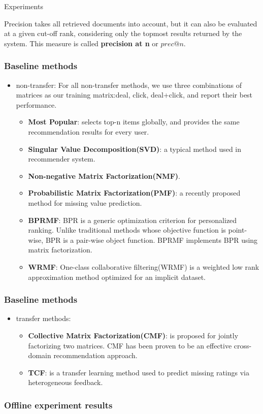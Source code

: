 \documentclass[xetex,mathserif,serif]{beamer}
\begin{document}
\begin{section}{Experiments}
\begin{frame}
    \par{Precision takes all retrieved documents into account, but it can also be evaluated at a given cut-off rank, considering only the topmost results returned by the system. This measure is called \textbf{precision at n} or \textbf{$prec@n$}.}
  \end{frame}
  \begin{frame}
    \frametitle{Baseline methods}
    \begin{itemize}
    \item non-transfer:
      For all non-transfer methods, we use three combinations of matrices as our training matrix:{deal, click, deal+click}, and report their \alert{best} performance.
      \begin{itemize}
      \item \textbf{Most Popular}: selects top-n items globally, and provides the same recommendation results for every user.
      \item \textbf{Singular Value Decomposition(SVD)}: a typical method used in recommender system.
      \item \textbf{Non-negative Matrix Factorization(NMF)}.
      \item \textbf{Probabilistic Matrix Factorization(PMF)}: a recently proposed method for missing value prediction.
      \item \textbf{BPRMF}: BPR is a generic optimization criterion for personalized ranking. Unlike traditional methods whose objective function is point-wise, BPR is a pair-wise object function. BPRMF implements BPR using matrix factorization.
      \item \textbf{WRMF}: One-class collaborative filtering(WRMF) is a weighted low rank approximation method optimized for an implicit dataset. 
      \end{itemize}
    \end{itemize}
  \end{frame}
  \begin{frame}
    \frametitle{Baseline methods}
    \begin{itemize}
    \item transfer methods:
      \begin{itemize}
      \item \textbf{Collective Matrix Factorization(CMF)}: is proposed for jointly factorizing two matrices. CMF has been proven to be an effective cross-domain recommendation approach. 
      \item \textbf{TCF}: is a transfer learning method used to predict missing ratings via heterogeneous feedback.
      \end{itemize}
    \end{itemize}
  \end{frame}
  \begin{frame}
    \frametitle{Offline experiment results}
    \begin{table}



\end{table}
\end{frame}
\end{section}
\end{document}
